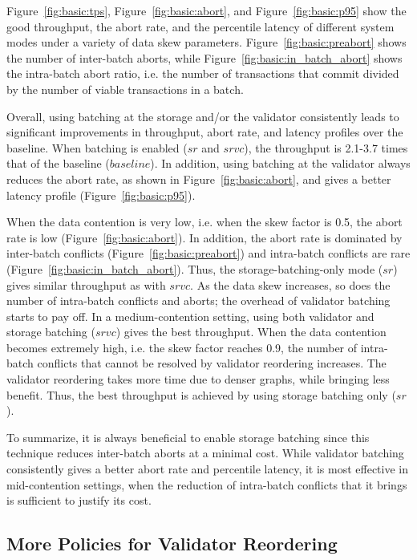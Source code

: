 Figure~\ref{fig:basic:tps}, Figure~\ref{fig:basic:abort}, and Figure~\ref{fig:basic:p95} show the good throughput, the abort rate, and the percentile latency of different system modes under a variety of data skew parameters. Figure~\ref{fig:basic:preabort} shows the number of inter-batch aborts, while Figure~\ref{fig:basic:in_batch_abort} shows the intra-batch abort ratio, i.e. the number of transactions that commit divided by the number of viable transactions in a batch.


Overall, using batching at the storage and/or the validator consistently leads to significant improvements in throughput, abort rate, and latency profiles over the baseline. When batching is enabled ($sr$ and $srvc$), the throughput is 2.1-3.7 times that of the baseline ($baseline$). In addition, using batching at the validator always reduces the abort rate, as shown in Figure~\ref{fig:basic:abort}, and gives a better latency profile (Figure~\ref{fig:basic:p95}).

When the data contention is very low, i.e. when the skew factor is 0.5, the abort rate is low (Figure~\ref{fig:basic:abort}). In addition, the abort rate is dominated by inter-batch conflicts (Figure~\ref{fig:basic:preabort}) and intra-batch conflicts are rare (Figure~\ref{fig:basic:in_batch_abort}). Thus, the storage-batching-only mode ($sr$) gives similar throughput as with $srvc$.  As the data skew increases, so does the number of intra-batch conflicts and aborts; the overhead of validator batching starts to pay off. In a medium-contention setting, using both validator and storage batching ($srvc$) gives the best throughput. When the data contention becomes extremely high, i.e. the skew factor reaches 0.9, the number of intra-batch conflicts that cannot be resolved by validator reordering increases. The validator reordering takes more time due to denser graphs, while bringing less benefit. Thus, the best throughput is achieved by using storage batching only ($sr$). 

To summarize, it is always beneficial to enable storage batching since this technique reduces inter-batch aborts at a minimal cost. While validator batching consistently gives a better abort rate and percentile latency, it is most effective in mid-contention settings, when the reduction of intra-batch conflicts that it brings is sufficient to justify its cost. 

\subsection{More Policies for Validator Reordering}

